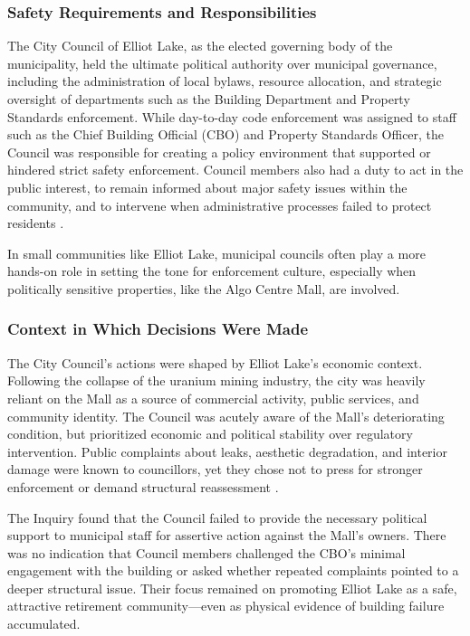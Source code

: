 \documentclass[12pt]{article}
\begin{document}
\subsubsection*{Safety Requirements and Responsibilities}

The City Council of Elliot Lake, as the elected governing body of the municipality, held the ultimate political authority over municipal governance, including the administration of local bylaws, resource allocation, and strategic oversight of departments such as the Building Department and Property Standards enforcement. While day-to-day code enforcement was assigned to staff such as the Chief Building Official (CBO) and Property Standards Officer, the Council was responsible for creating a policy environment that supported or hindered strict safety enforcement. Council members also had a duty to act in the public interest, to remain informed about major safety issues within the community, and to intervene when administrative processes failed to protect residents \cite[p375-377]{AlgoLakeReport1}.

In small communities like Elliot Lake, municipal councils often play a more hands-on role in setting the tone for enforcement culture, especially when politically sensitive properties, like the Algo Centre Mall, are involved.

\subsubsection*{Context in Which Decisions Were Made}

The City Council's actions were shaped by Elliot Lake's economic context. Following the collapse of the uranium mining industry, the city was heavily reliant on the Mall as a source of commercial activity, public services, and community identity. The Council was acutely aware of the Mall's deteriorating condition, but prioritized economic and political stability over regulatory intervention. Public complaints about leaks, aesthetic degradation, and interior damage were known to councillors, yet they chose not to press for stronger enforcement or demand structural reassessment \cite[p377]{AlgoLakeReport1}.

The Inquiry found that the Council failed to provide the necessary political support to municipal staff for assertive action against the Mall's owners. There was no indication that Council members challenged the CBO's minimal engagement with the building or asked whether repeated complaints pointed to a deeper structural issue. Their focus remained on promoting Elliot Lake as a safe, attractive retirement community—even as physical evidence of building failure accumulated.
\end{document}
